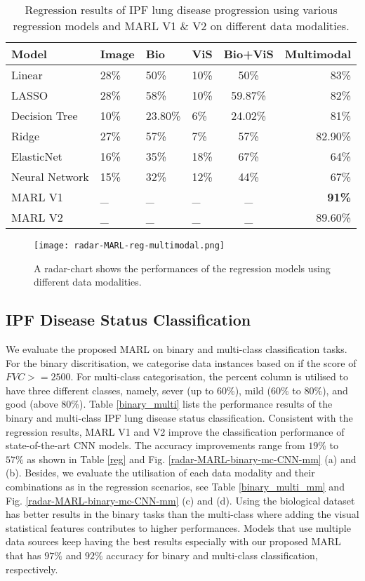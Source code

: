 \documentclass[conference]{IEEEtran}
\begin{document}
%
\begin{table}[]
\centering
\caption{Regression results of IPF lung disease progression using various regression models and MARL V1 \& V2 on different data modalities.}\label{reg_mm}
\begin{tabular}{|p{2cm}|p{0.5cm}|p{0.5cm}|p{0.5cm}|c|r|}
\hline
Model & Image & Bio & ViS & Bio+ViS & Multimodal \\ \hline
Linear & 28\% & 50\% & 10\% & 50\% & 83\% \\ \hline
LASSO & 28\% & 58\% & 10\% & 59.87\% & 82\% \\ \hline
Decision Tree & 10\% & 23.80\% & 6\% & 24.02\% & 81\% \\ \hline
Ridge & 27\% & 57\% & 7\% & 57\% & 82.90\% \\ \hline
ElasticNet & 16\% & 35\% & 18\% & 67\% & 64\% \\ \hline
Neural Network & 15\% & 32\% & 12\% & 44\% & 67\% \\ \hline
MARL V1 & \_ & \_ & \_ & \_ & \textbf{91\%} \\ \hline
MARL V2 & \_ & \_ & \_ & \_ & 89.60\% \\ \hline
\end{tabular}
\end{table}


\begin{figure}
    \centering
\texttt{[image: radar-MARL-reg-multimodal.png]}
    \caption{A radar-chart shows the performances of the regression models using different data modalities.}
    \label{radar-MARL-reg-multimodal}
\end{figure}
%

\subsection{IPF Disease Status Classification}
We evaluate the proposed MARL on binary and multi-class classification tasks. For the binary discritisation, we categorise data instances based on if the score of $FVC >=2500$. For multi-class categorisation, the percent column is utilised to have three different classes, namely, sever (up to $60\%$), mild ($60\%$ to $80\%$), and good (above $80\%$).
Table \ref{binary_multi} lists the performance results of the binary and multi-class IPF lung disease status classification. Consistent with the regression results, MARL V1 and V2 improve the classification performance of state-of-the-art CNN models. The accuracy improvements range from $19\%$ to $57\%$ as shown in Table \ref{reg} and Fig. \ref{radar-MARL-binary-mc-CNN-mm} (a) and (b). Besides, we evaluate the utilisation of each data modality and their combinations as in the regression scenarios, see Table \ref{binary_multi_mm} and Fig. \ref{radar-MARL-binary-mc-CNN-mm} (c) and (d). Using the biological dataset has better results in the binary tasks than the multi-class where adding the visual statistical features contributes to higher performances. Models that use multiple data sources keep having the best results especially with our proposed MARL that has $97\%$ and $92\%$ accuracy for binary and multi-class classification, respectively.
\end{document}
